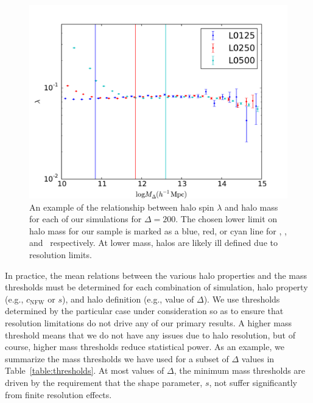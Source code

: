 \documentclass[usenatbib,usegraphicx,letterpaper]{mn2e}
\begin{document}
\begin{figure}
\centering
\includegraphics[width=.5\textwidth]{masscut_spin_d200.pdf}
\caption{
An example of the relationship between halo spin $\lambda$ 
and halo mass for each of our simulations for $\Delta =200$. 
The chosen lower limit on halo mass for our sample is marked 
as a blue, red, or cyan line for \simA, \simB, and \simC \ respectively. 
At lower mass, halos are likely ill defined due to resolution limits.
}
\label{fig:spinrelation}
\end{figure}

In practice, the mean relations between the various halo properties and the mass thresholds must be determined 
for each combination of simulation, halo property (e.g., $c_{\mathrm{NFW}}$ or $s$), and halo definition (e.g., value 
of $\Delta$). We use thresholds determined by the particular case under consideration so as to ensure that resolution 
limitations do not drive any of our primary results. A higher mass threshold means that we do not have any 
issues due to halo resolution, but of course, higher mass thresholds reduce statistical power. As an example, we 
summarize the mass thresholds we have used for a subset of $\Delta$ values in Table~\ref{table:thresholds}. 
At most values of $\Delta$, the minimum mass thresholds are driven by the requirement that the shape parameter, $s$, 
not suffer significantly from finite resolution effects. 

\end{document}
